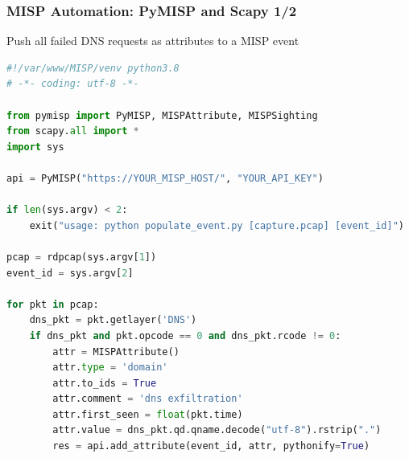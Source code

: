 \begin{frame}[fragile]
    \frametitle{MISP Automation: PyMISP and Scapy 1/2}
    Push all failed DNS requests as attributes to a MISP event
    \begin{lstlisting}[basicstyle=\tiny\color{black},language=Python]
#!/var/www/MISP/venv python3.8
# -*- coding: utf-8 -*-

from pymisp import PyMISP, MISPAttribute, MISPSighting
from scapy.all import *
import sys

api = PyMISP("https://YOUR_MISP_HOST/", "YOUR_API_KEY")

if len(sys.argv) < 2:
    exit("usage: python populate_event.py [capture.pcap] [event_id]")
    
pcap = rdpcap(sys.argv[1])
event_id = sys.argv[2]

for pkt in pcap:
    dns_pkt = pkt.getlayer('DNS')
    if dns_pkt and pkt.opcode == 0 and dns_pkt.rcode != 0:
        attr = MISPAttribute()
        attr.type = 'domain'
        attr.to_ids = True
        attr.comment = 'dns exfiltration'
        attr.first_seen = float(pkt.time)
        attr.value = dns_pkt.qd.qname.decode("utf-8").rstrip(".")
        res = api.add_attribute(event_id, attr, pythonify=True)
	\end{lstlisting}
\end{frame}


